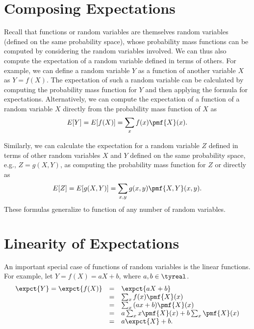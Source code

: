 



\section{Composing Expectations}
\label{sec:probability::expectation::compose}
\begin{gram}
Recall that functions or random variables are themselves random
variables (defined on the same probability space), whose probability
mass functions can be computed by considering the random variables
involved.
%
We can thus also compute the expectation of a random variable defined
in terms of others.
%
For example, we can define a random variable $Y$ as a function of
another variable $X$ as $Y = f(X)$.
%
The expectation of such a random variable can be calculated by
computing the probability mass function for $Y$ and then applying the
formula for expectations.
%
Alternatively, we can compute the expectation of a function of a
random variable $X$ directly from the probability mass function of $X$
as
\[
E[Y] = E[f(X)] = \sum_{x}{f(x) \pmf{X}(x)}.
\] 
\end{gram}

\begin{gram}
Similarly, we can calculate the expectation for a random variable $Z$
defined in terms of other random variables $X$ and $Y$ defined on the
same probability space, e.g., $Z = g(X,Y)$, as computing the
probability mass function for $Z$ or directly as
\[
E[Z] = E[g(X,Y)] = \sum_{x,y}{g(x,y) \pmf{X,Y}(x,y)}.
\] 
These formulas generalize to function of any number of random
variables.
\end{gram}

\section{Linearity of Expectations}
\label{sec:probability::expectation::linearity}

\begin{gram}
An important special case of functions of random variables is the
linear functions.  For example, let $Y = f(X) = aX + b$, where $a, b
\in \tyreal$.
%
\[
\begin{array}{lll}
\expct{Y} = \expct{f(X)} 
& = & \expct{aX + b} 
\\
& = & \sum_{x}{f(x) \pmf{X}(x)}
\\
& = & \sum_{x}{(ax + b) \pmf{X}(x)}
\\
& = & a\sum_{x}{x\pmf{X}(x)} + b\sum_{x}{\pmf{X}(x)}
\\
& = & a\expct{X} + b.
\end{array}
\]
\end{gram}

